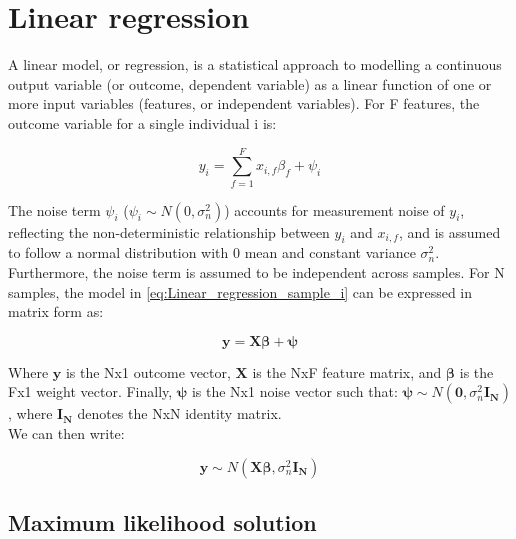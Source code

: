 
\section{Linear regression} 

A linear model, or regression, is a statistical approach to modelling a continuous output variable (or outcome, dependent variable) as a linear function of one or more input variables (features, or independent variables). 
For F features, the outcome variable for a single individual i is:

\begin{equation} \label{eq:Linear_regression_sample_i}
 y_i = \sum_{f=1}^{F} x_{i,f}\beta_f + \psi_i
\end{equation}

The noise term $\psi_i$ ($ \psi_i \sim N(0, \sigma_n^2)$) accounts for measurement noise of $y_i$, reflecting the non-deterministic relationship between $y_i$ and $x_{i,f}$, and is assumed to follow a normal distribution with 0 mean and constant variance $\sigma_n^2$. 
Furthermore, the noise term is assumed to be independent across samples. 
For N samples, the model in \eqref{eq:Linear_regression_sample_i} can be expressed in matrix form as:

\begin{equation} \label{eq:Linear_regression_matrix_form}
\mathbf{y} = \mathbf{X}\boldsymbol{\beta} + \boldsymbol{\psi} 
\end{equation}

Where $\mathbf{y}$ is the Nx1 outcome vector, $\mathbf{X}$ is the NxF feature matrix, and $\boldsymbol{\beta}$ is the Fx1 weight vector. 
Finally, $\boldsymbol{\psi}$ is the Nx1 noise vector such that: $\boldsymbol{\psi}\sim N(\mathbf{0}, \sigma_n^2 \mathbf{I_N})$, where $\mathbf{I_N}$ denotes the NxN identity matrix. \\ 

We can then write:

\begin{equation} \label{eq:Linear_regression_MVN_form}
\mathbf{y} \sim N(\mathbf{X}\boldsymbol{\beta}, \sigma_n^2 \mathbf{I_N}) 
\end{equation}

\newpage

\subsection{Maximum likelihood solution}

